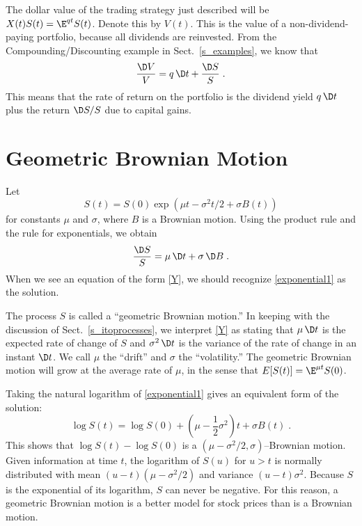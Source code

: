 The dollar value of the trading strategy just described will be $X(t)S(t) = \E^{q t}S(t)$.  Denote this by $V(t)$.  This is the value of a non-dividend-paying portfolio, because all dividends are reinvested.  From the Compounding/Discounting example in Sect.~\ref{s_examples}, we know that
\begin{equation}\label{reinvestingdividends} 
\frac{\D V}{V} = q\,\D t + \frac{\D S}{S}\;.
\end{equation}
This means that the rate of return on the portfolio is the dividend yield $q\,\D t$ plus the return $\D S/S$ due to capital gains.

\newpage
\section{Geometric Brownian Motion}\label{s_geometricbrownianmotion}
Let
\begin{equation}\label{exponential1}
S(t)=S(0)\exp\left(\mu t- \sigma^2 t/2 + \sigma B(t)\right)
\end{equation}
for constants $\mu$ and $\sigma$, where $B$ is a Brownian motion.
Using the product rule and the rule for exponentials, we obtain
\begin{equation}\label{Y}
\frac{\D S}{S} = \mu\,\D t+\sigma\,\D B\;.
\end{equation}
When we see an equation of the form \eqref{Y}, we should recognize \eqref{exponential1} as the solution.  

The process $S$ is called a ``geometric Brownian motion.''   In keeping with the discussion of Sect.~\ref{s_itoprocesses}, we interpret \eqref{Y} as stating that $\mu\,\D t$ is the expected rate of change of $S$ and $\sigma^2\,\D t$ is the variance of the rate of change in an instant $\D t$.  We call $\mu$ the ``drift'' and $\sigma$ the ``volatility.''   The geometric Brownian motion will grow at the average rate of $\mu$, in the sense that $E[S(t)] = \E^{\mu t}S(0)$.

Taking the natural logarithm of \eqref{exponential1} gives an equivalent form of the solution:
\begin{equation}\label{exponential2}
\log S(t)= \log S(0)+\left(\mu -\frac{1}{2}\sigma^2\right)t + \sigma B(t)\;.
\end{equation}  This shows that $\log S(t) - \log S(0)$ is a $(\mu-\sigma^2/2,\sigma)$--Brownian motion.  Given information at time $t$, the logarithm of $S(u)$ for $u>t$ is normally distributed with mean $(u-t)(\mu-\sigma^2/2)$ and variance $(u-t)\sigma^2$.  Because $S$ is the exponential of its logarithm, $S$ can never be negative.  For this reason, a geometric Brownian motion is a better model for stock prices than is a Brownian motion.

